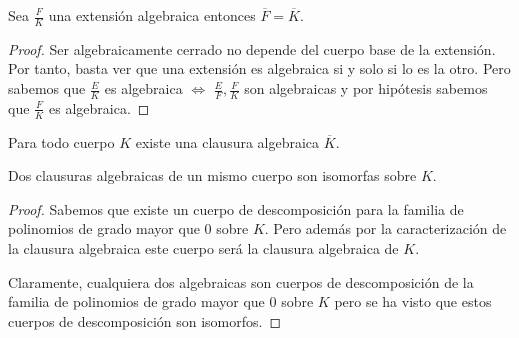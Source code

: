 \begin{proposition}
Sea $\frac{F}{K}$ una extensión algebraica entonces $\overline{F} = \overline{K}$.
\end{proposition}
\begin{proof}
Ser algebraicamente cerrado no depende del cuerpo base de la extensión. Por tanto, basta ver que una extensión es algebraica si y solo si lo es la otro. Pero sabemos que $\frac{E}{K}$ es algebraica $\iff$ $\frac{E}{F},\frac{F}{K}$ son algebraicas y por hipótesis sabemos que $\frac{F}{K}$ es algebraica. 
\end{proof}

\begin{theorem}
	Para todo cuerpo $K$ existe una clausura algebraica $\overline{K}$. 
	
	Dos clausuras algebraicas de un mismo cuerpo son isomorfas sobre $K$. 
\end{theorem}
\begin{proof}
Sabemos que existe un cuerpo de descomposición para la familia de polinomios de grado mayor que 0 sobre $K$. Pero además por la caracterización de la clausura algebraica este cuerpo será la clausura algebraica de $K$.

Claramente, cualquiera dos algebraicas son cuerpos de descomposición de la familia de polinomios de grado mayor que 0 sobre $K$ pero se ha visto que estos cuerpos de descomposición son isomorfos. 
\end{proof}


